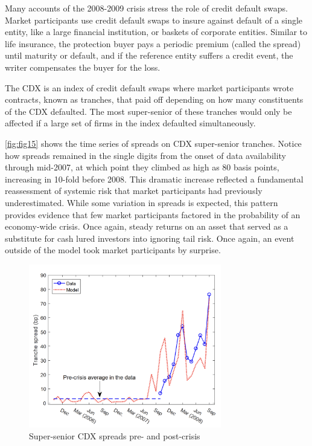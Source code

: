 Many accounts of the 2008-2009 crisis stress the role of credit default swaps. Market participants use credit default swaps to insure against default of a single entity, like a large financial institution, or baskets of corporate entities. Similar to life insurance, the protection buyer pays a periodic premium (called the spread) until maturity or default, and if the reference entity suffers a credit event, the writer compensates the buyer for the loss.

The CDX is an index of credit default swaps where market participants wrote contracts, known as tranches, that paid off depending on how many constituents of the CDX defaulted. The most super-senior of these tranches would only be affected if a large set of firms in the index defaulted simultaneously. 

\autoref{fig:fig15} \citep{seo2018rare} shows the time series of spreads on CDX super-senior tranches. Notice how spreads remained in the single digits from the onset of data availability through mid-2007, at which point they climbed as high as 80 basis points, increasing in 10-fold before 2008. This dramatic increase reflected a fundamental reassessment of systemic risk that market participants had previously underestimated. While some variation in spreads is expected, this pattern provides evidence that few market participants factored in the probability of an economy-wide crisis. Once again, steady returns on an asset that served as a substitute for cash lured investors into ignoring tail risk. Once again, an event outside of the model took market participants by surprise. 

\begin{figure}[h]
    \centering
    \includegraphics[width=0.75\textwidth]{fig15.png}
    \caption{Super-senior CDX spreads pre- and post-crisis \citep{seo2018rare}}
    \label{fig:fig15}
\end{figure}


